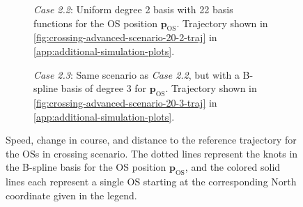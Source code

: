 \begin{figure}
    \centering
    \begin{subfigure}[b]{\textwidth}
        
        \caption{\emph{Case 2.2}: Uniform degree 2 basis with 22 basis functions for the OS position $\mathbf p_\text{OS}$. Trajectory shown in \cref{fig:crossing-advanced-scenario-20-2-traj} in \cref{app:additional-simulation-plots}.}
        \label{fig:crossing-advanced-scenario-20-2}
    \end{subfigure}
    \begin{subfigure}[b]{\textwidth}
        
        \caption{\emph{Case 2.3}: Same scenario as \emph{Case 2.2}, but with a B-spline basis of degree 3 for $\mathbf p_\text{OS}$. Trajectory shown in \cref{fig:crossing-advanced-scenario-20-3-traj} in \cref{app:additional-simulation-plots}.}
        \label{fig:crossing-advanced-scenario-20-3}
    \end{subfigure}
    \caption{Speed, change in course, and distance to the reference trajectory for the OSs in crossing scenario. The dotted lines represent the knots in the B-spline basis for the OS position $\mathbf p_\text{OS}$, and the colored solid lines each represent a single OS starting at the corresponding North coordinate given in the legend.}
    \label{fig:crossing-advanced-scenario-metrics}
\end{figure}


